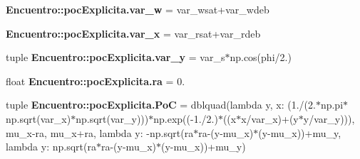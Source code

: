\begin{DoxyCompactItemize}
{\bf \-Encuentro\-::poc\-Explicita.\-var\-\_\-w} = var\-\_\-wsat+var\-\_\-wdeb
\item 
{\bf \-Encuentro\-::poc\-Explicita.\-var\-\_\-x} = var\-\_\-rsat+var\-\_\-rdeb
\item 
tuple {\bf \-Encuentro\-::poc\-Explicita.\-var\-\_\-y} = var\-\_\-s$\ast$np.\-cos(phi/2.)
\item 
float {\bf \-Encuentro\-::poc\-Explicita.\-ra} = 0.
\item 
tuple {\bf \-Encuentro\-::poc\-Explicita.\-Po\-C} = dblquad(lambda y, x\-: (1./(2.$\ast$np.\-pi$\ast$np.\-sqrt(var\-\_\-x)$\ast$np.\-sqrt(var\-\_\-y)))$\ast$np.\-exp((-\/1./2.)$\ast$((x$\ast$x/var\-\_\-x)+(y$\ast$y/var\-\_\-y))), mu\-\_\-x-\/ra, mu\-\_\-x+ra, lambda y\-: -\/np.\-sqrt(ra$\ast$ra-\/(y-\/mu\-\_\-x)$\ast$(y-\/mu\-\_\-x))+mu\-\_\-y, lambda y\-: np.\-sqrt(ra$\ast$ra-\/(y-\/mu\-\_\-x)$\ast$(y-\/mu\-\_\-x))+mu\-\_\-y)
\end{DoxyCompactItemize}
